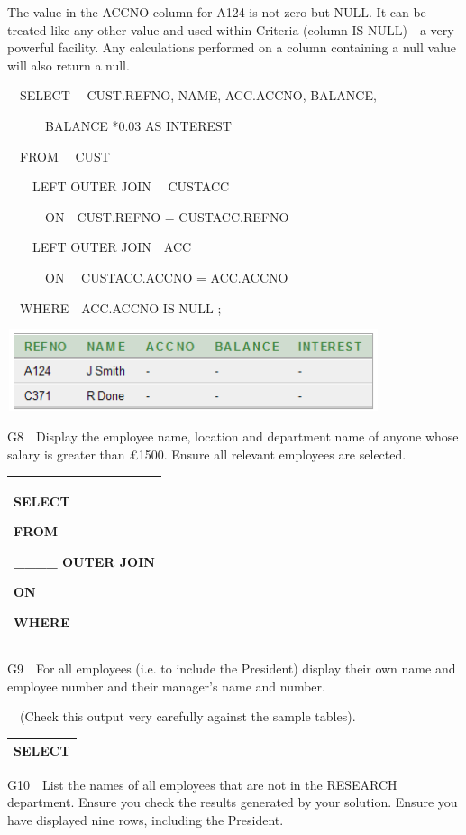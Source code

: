 The value in the ACCNO column for A124 is not zero but NULL.  It can be treated like any other value and used within Criteria (column IS NULL) - a very powerful facility.  Any calculations performed on a column containing a null value will also return a null.

\ \ SELECT \ \ CUST.REFNO, NAME, ACC.ACCNO, BALANCE, 

\ \ \ \ \ \ BALANCE *0.03 AS INTEREST

\ \ FROM \ \ CUST

\ \ \ \ LEFT OUTER JOIN \ \ CUSTACC 

\ \ \ \ \ \ ON\ \ CUST.REFNO  =  CUSTACC.REFNO

\ \ \ \ LEFT OUTER JOIN\ \ ACC  

\ \ \ \ \ \ ON \ \ CUSTACC.ACCNO  = ACC.ACCNO

\ \ WHERE\ \ ACC.ACCNO IS NULL ;

   
\includegraphics[width=10.918cm,height=2.388cm]{images/img (49).png}
 

G8\ \ Display the employee name, location and department name of anyone whose salary is greater than £1500.  Ensure all relevant employees are selected.

\begin{flushleft}
\tablefirsthead{}
\tablehead{}
\tabletail{}
\tablelasttail{}
\begin{supertabular}{|m{14.793cm}|}
\hline
SELECT

FROM

\_\_\_\_ OUTER JOIN

ON

WHERE

\\\hline
\end{supertabular}
\end{flushleft}
G9\ \ For all employees (i.e. to include the President) display their own name and employee number and their manager's name and number.

\ \ (Check this output very carefully against the sample tables).

\begin{flushleft}
\tablefirsthead{}
\tablehead{}
\tabletail{}
\tablelasttail{}
\begin{supertabular}{|m{14.266cm}|}
\hline
SELECT

\\\hline
\end{supertabular}
\end{flushleft}
G10\ \ List the names of all employees that are not in the RESEARCH department.  Ensure you check the results generated by your solution. Ensure you have displayed nine rows, including the President.

